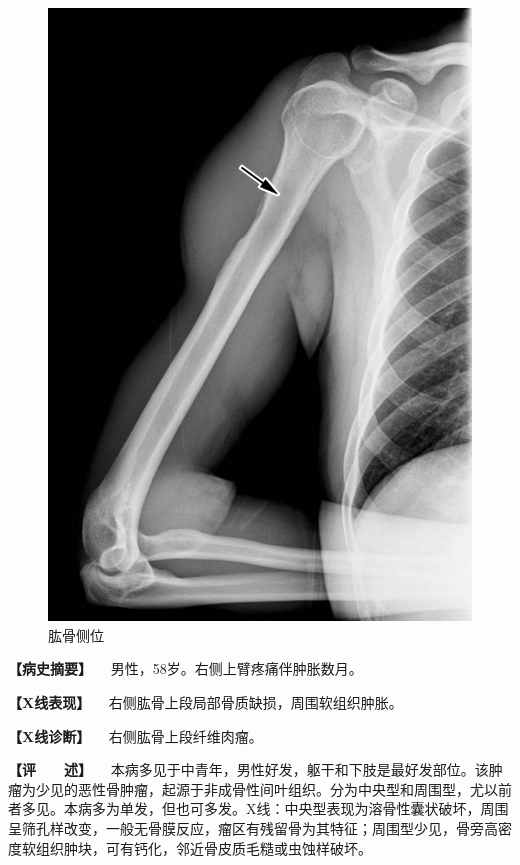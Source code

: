 \begin{figure}[!htbp]
 \centering
 \includegraphics{./images/Image00101.jpg}
 \captionsetup{justification=centering}
 \caption{肱骨侧位}
 \label{fig2-7-16}
  \end{figure} 

\textbf{【病史摘要】} 　男性，58岁。右侧上臂疼痛伴肿胀数月。

\textbf{【X线表现】} 　右侧肱骨上段局部骨质缺损，周围软组织肿胀。

\textbf{【X线诊断】} 　右侧肱骨上段纤维肉瘤。

\textbf{【评　　述】}
　本病多见于中青年，男性好发，躯干和下肢是最好发部位。该肿瘤为少见的恶性骨肿瘤，起源于非成骨性间叶组织。分为中央型和周围型，尤以前者多见。本病多为单发，但也可多发。X线：中央型表现为溶骨性囊状破坏，周围呈筛孔样改变，一般无骨膜反应，瘤区有残留骨为其特征；周围型少见，骨旁高密度软组织肿块，可有钙化，邻近骨皮质毛糙或虫蚀样破坏。

